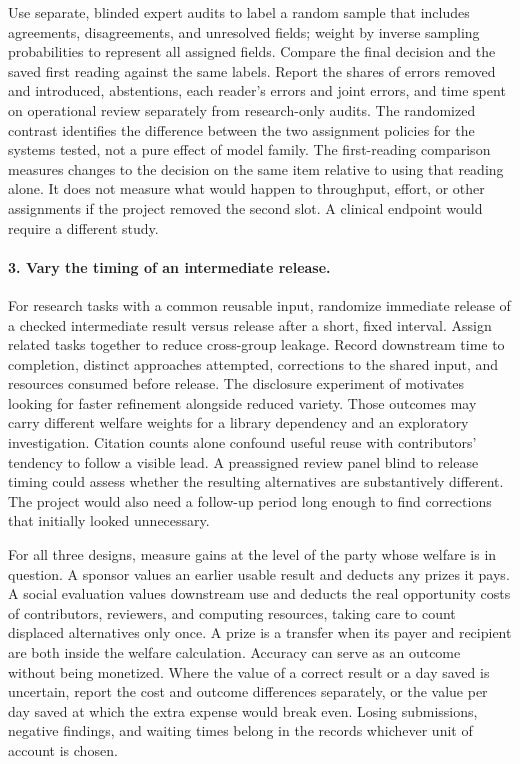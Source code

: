 \documentclass[11pt,letterpaper]{article}
\begin{document}
Use separate, blinded expert audits to label a random sample that includes agreements, disagreements, and unresolved fields; weight by inverse sampling probabilities to represent all assigned fields. Compare the final decision and the saved first reading against the same labels. Report the shares of errors removed and introduced, abstentions, each reader's errors and joint errors, and time spent on operational review separately from research-only audits. The randomized contrast identifies the difference between the two assignment policies for the systems tested, not a pure effect of model family. The first-reading comparison measures changes to the decision on the same item relative to using that reading alone. It does not measure what would happen to throughput, effort, or other assignments if the project removed the second slot. A clinical endpoint would require a different study.

\paragraph{3. Vary the timing of an intermediate release.}
For research tasks with a common reusable input, randomize immediate release of a checked intermediate result versus release after a short, fixed interval. Assign related tasks together to reduce cross-group leakage. Record downstream time to completion, distinct approaches attempted, corrections to the shared input, and resources consumed before release. The disclosure experiment of \citet{disclosure} motivates looking for faster refinement alongside reduced variety. Those outcomes may carry different welfare weights for a library dependency and an exploratory investigation. Citation counts alone confound useful reuse with contributors' tendency to follow a visible lead. A preassigned review panel blind to release timing could assess whether the resulting alternatives are substantively different. The project would also need a follow-up period long enough to find corrections that initially looked unnecessary.

For all three designs, measure gains at the level of the party whose welfare is in question. A sponsor values an earlier usable result and deducts any prizes it pays. A social evaluation values downstream use and deducts the real opportunity costs of contributors, reviewers, and computing resources, taking care to count displaced alternatives only once. A prize is a transfer when its payer and recipient are both inside the welfare calculation. Accuracy can serve as an outcome without being monetized. Where the value of a correct result or a day saved is uncertain, report the cost and outcome differences separately, or the value per day saved at which the extra expense would break even. Losing submissions, negative findings, and waiting times belong in the records whichever unit of account is chosen.
\end{document}
